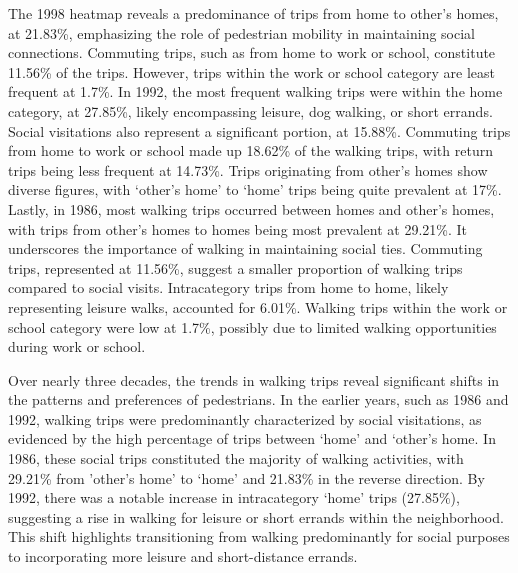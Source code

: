 \documentclass[
11pt, %
oneside, %
english, %
singlespacing, %
]{macthesis} %
\begin{document}
The 1998 heatmap reveals a predominance of trips from home to other's homes, at 21.83\%, emphasizing the role of pedestrian mobility in maintaining social connections. Commuting trips, such as from home to work or school, constitute 11.56\% of the trips. However, trips within the work or school category are least frequent at 1.7\%. In 1992, the most frequent walking trips were within the home category, at 27.85\%, likely encompassing leisure, dog walking, or short errands. Social visitations also represent a significant portion, at 15.88\%. Commuting trips from home to work or school made up 18.62\% of the walking trips, with return trips being less frequent at 14.73\%. Trips originating from other's homes show diverse figures, with `other's home' to `home' trips being quite prevalent at 17\%. Lastly, in 1986, most walking trips occurred between homes and other's homes, with trips from other's homes to homes being most prevalent at 29.21\%. It underscores the importance of walking in maintaining social ties. Commuting trips, represented at 11.56\%, suggest a smaller proportion of walking trips compared to social visits. Intracategory trips from home to home, likely representing leisure walks, accounted for 6.01\%. Walking trips within the work or school category were low at 1.7\%, possibly due to limited walking opportunities during work or school.

Over nearly three decades, the trends in walking trips reveal significant shifts in the patterns and preferences of pedestrians. In the earlier years, such as 1986 and 1992, walking trips were predominantly characterized by social visitations, as evidenced by the high percentage of trips between `home' and `other's home. In 1986, these social trips constituted the majority of walking activities, with 29.21\% from 'other's home' to `home' and 21.83\% in the reverse direction. By 1992, there was a notable increase in intracategory `home' trips (27.85\%), suggesting a rise in walking for leisure or short errands within the neighborhood. This shift highlights transitioning from walking predominantly for social purposes to incorporating more leisure and short-distance errands.
\end{document}

